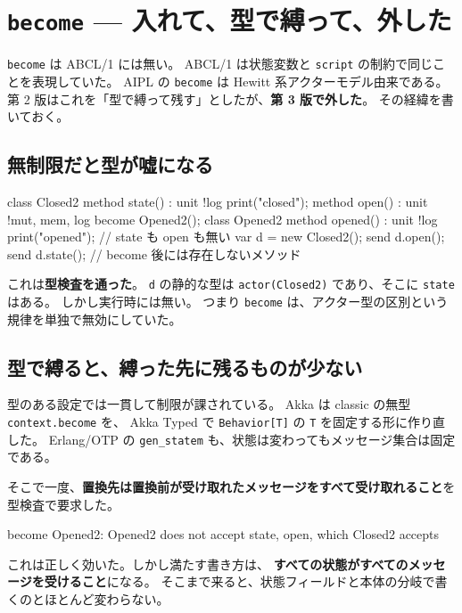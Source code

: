 \documentclass[11pt,a4paper]{ltjsarticle}
\theoremstyle{definition}
\theoremstyle{remark}
\begin{document}
\section{\texttt{become} --- 入れて、型で縛って、外した}
\label{sec:become}

\texttt{become} は ABCL/1 には無い。
ABCL/1 は状態変数と \texttt{script} の制約で同じことを表現していた。
AIPL の \texttt{become} は Hewitt 系アクターモデル由来である。
第 2 版はこれを「型で縛って残す」としたが、\textbf{第 3 版で外した}。
その経緯を書いておく。

\subsection{無制限だと型が嘘になる}

\begin{aipl}
class Closed2 {
  method state() : unit !{log} { print("closed"); }
  method open()  : unit !{mut, mem, log} { become Opened2(); }
}
class Opened2 {
  method opened() : unit !{log} { print("opened"); }   // state も open も無い
}
var d = new Closed2();
send d.open();
send d.state();        // become 後には存在しないメソッド
\end{aipl}

これは\textbf{型検査を通った}。
\texttt{d} の静的な型は \texttt{actor(Closed2)} であり、そこに \texttt{state} はある。
しかし実行時には無い。
つまり \texttt{become} は、アクター型の区別という規律を単独で無効にしていた。

\subsection{型で縛ると、縛った先に残るものが少ない}

型のある設定では一貫して制限が課されている。
Akka は classic の無型 \texttt{context.become} を、
Akka Typed で \texttt{Behavior[T]} の \texttt{T} を固定する形に作り直した。
Erlang/OTP の \texttt{gen\_statem} も、状態は変わってもメッセージ集合は固定である。

そこで一度、\textbf{置換先は置換前が受け取れたメッセージをすべて受け取れること}を
型検査で要求した。

\begin{term}
 become Opened2: Opened2 does not accept state, open,
             which Closed2 accepts
\end{term}

これは正しく効いた。しかし満たす書き方は、
\textbf{すべての状態がすべてのメッセージを受けること}になる。
そこまで来ると、状態フィールドと本体の分岐で書くのとほとんど変わらない。
\end{document}
